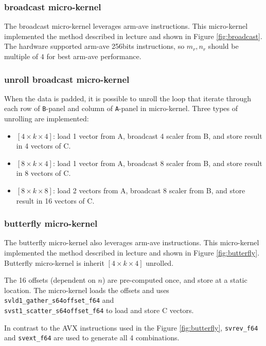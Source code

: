 \documentclass[12pt]{article}
\begin{document}
\subsubsection{broadcast micro-kernel}
The broadcast micro-kernel leverages arm-ave instructions.
This micro-kernel implemented the method described in lecture and shown in Figure \ref*{fig:broadcast}.
The hardware supported arm-ave 256bits instructions, 
so $m_r, n_r$ should be multiple of $4$ for best arm-ave performance.

\subsubsection{unroll broadcast micro-kernel}
When the data is padded, it is possible to unroll the loop that iterate through 
each row of \texttt{B}-panel and column of \texttt{A}-panel in micro-kernel.
Three types of unrolling are implemented:
\begin{itemize}
    \item $[4 \times k \times 4]$: load 1 vector from A, broadcast 4 scaler from B, and store result in 4 vectors of C.
    \item $[8 \times k \times 4]$: load 1 vector from A, broadcast 8 scaler from B, and store result in 8 vectors of C.
    \item $[8 \times k \times 8]$: load 2 vectors from A, broadcast 8 scaler from B, and store result in 16 vectors of C.
\end{itemize}


\subsubsection{butterfly micro-kernel}
The butterfly micro-kernel also leverages arm-ave instructions.
This micro-kernel implemented the method described in lecture and shown in Figure \ref*{fig:butterfly}.
Butterfly micro-kernel is inherit $[4 \times k \times 4]$ unrolled.

The 16 offsets (dependent on $n$) are pre-computed once,
and store at a static location.
The micro-kernel loads the offsets and uses 
\texttt{svld1\_gather\_s64offset\_f64} and \\
\texttt{svst1\_scatter\_s64offset\_f64}
to load and store C vectors.

In contrast to the AVX instructions used in the Figure \ref*{fig:butterfly}, 
\texttt{svrev\_f64} and \texttt{svext\_f64} 
are used to generate all 4 combinations.
\end{document}
